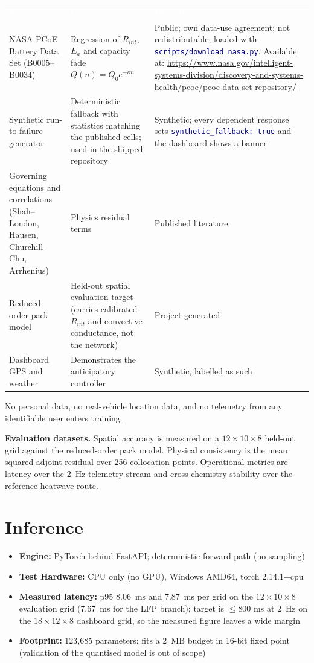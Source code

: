 \documentclass[10.5pt,a4paper]{article}
\renewcommand{\arraystretch}{1.3}
\newcommand{\code}[1]{\texttt{\textcolor{navy}{#1}}}
\newcommand{\tablehead}[1]{\textcolor{white}{\textbf{#1}}}
\begin{document}
{\small
\renewcommand{\arraystretch}{1.25}
\begin{tabularx}{\linewidth}{@{}>{\raggedright\arraybackslash}p{3.6cm}>{\raggedright\arraybackslash}X>{\raggedright\arraybackslash}p{3.8cm}@{}}
\rowcolor{navy}
\tablehead{Source} & \tablehead{Use} & \tablehead{Provenance} \\
NASA PCoE Battery Data Set (B0005--B0034) & Regression of $R_{int}$, $E_a$ and capacity fade $Q(n)=Q_0e^{-\kappa n}$ & Public; own data-use agreement; not redistributable; loaded with \code{scripts/download\_nasa.py}. Available at: \url{https://www.nasa.gov/intelligent-systems-division/discovery-and-systems-health/pcoe/pcoe-data-set-repository/} \\
Synthetic run-to-failure generator & Deterministic fallback with statistics matching the published cells; used in the shipped repository & Synthetic; every dependent response sets \code{synthetic\_fallback: true} and the dashboard shows a banner \\
Governing equations and correlations (Shah--London, Hausen, Churchill--Chu, Arrhenius) & Physics residual terms & Published literature \\
Reduced-order pack model & Held-out spatial evaluation target (carries calibrated $R_{int}$ and convective conductance, not the network) & Project-generated \\
Dashboard GPS and weather & Demonstrates the anticipatory controller & Synthetic, labelled as such \\
\bottomrule
\end{tabularx}
}

No personal data, no real-vehicle location data, and no telemetry from any identifiable user enters training.

\textbf{Evaluation datasets.} Spatial accuracy is measured on a $12\times10\times8$ held-out grid against the reduced-order pack model. Physical consistency is the mean squared adjoint residual over 256 collocation points. Operational metrics are latency over the 2~Hz telemetry stream and cross-chemistry stability over the reference heatwave route.

\section*{Inference}
\begin{itemize}
  \item \textbf{Engine:} PyTorch behind FastAPI; deterministic forward path (no sampling)
  \item \textbf{Test Hardware:} CPU only (no GPU), Windows AMD64, torch 2.14.1+cpu
  \item \textbf{Measured latency:} p95 8.06~ms and 7.87~ms per grid on the $12\times10\times8$ evaluation grid (7.67~ms for the LFP branch); target is $\le 800$ ms at 2~Hz on the $18\times12\times8$ dashboard grid, so the measured figure leaves a wide margin
  \item \textbf{Footprint:} 123,685 parameters; fits a 2~MB budget in 16-bit fixed point (validation of the quantised model is out of scope)
\end{itemize}
\end{document}
